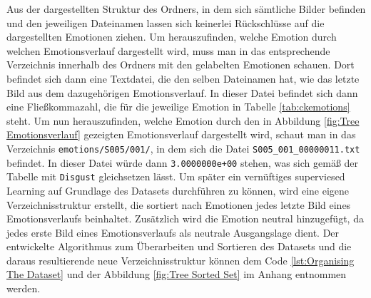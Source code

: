 \documentclass[12pt, a4paper]{report}
\begin{document}
Aus der dargestellten Struktur des Ordners, in dem sich sämtliche Bilder befinden und den jeweiligen Dateinamen lassen sich keinerlei Rückschlüsse auf die dargestellten Emotionen ziehen. Um herauszufinden, welche Emotion durch welchen Emotionsverlauf dargestellt wird, muss man in das entsprechende Verzeichnis innerhalb des Ordners mit den gelabelten Emotionen schauen. Dort befindet sich dann eine Textdatei, die den selben Dateinamen hat, wie das letzte Bild aus dem dazugehörigen Emotionsverlauf. In dieser Datei befindet sich dann eine Fließkommazahl, die für die jeweilige Emotion in Tabelle \ref{tab:ckemotions} steht. Um nun herauszufinden, welche Emotion durch den in Abbildung \ref{fig:Tree Emotionsverlauf} gezeigten Emotionsverlauf dargestellt wird, schaut man in das Verzeichnis \texttt{emotions/S005/001/}, in dem sich die Datei \texttt{S005\_001\_00000011.txt} befindet. In dieser Datei würde dann \texttt{3.0000000e+00} stehen, was sich gemäß der Tabelle mit \texttt{Disgust} gleichsetzen lässt.\newline
Um später ein vernüftiges superviesed Learning auf Grundlage des Datasets durchführen zu können, wird eine eigene Verzeichnisstruktur erstellt, die sortiert nach Emotionen jedes letzte Bild eines Emotionsverlaufs beinhaltet. Zusätzlich wird die Emotion neutral hinzugefügt, da jedes erste Bild eines Emotionsverlaufs als neutrale Ausgangslage dient. Der entwickelte Algorithmus zum Überarbeiten und Sortieren des Datasets und die daraus resultierende neue Verzeichnisstruktur können dem Code \ref{lst:Organising The Dataset} und der Abbildung \ref{fig:Tree Sorted Set} im Anhang entnommen werden.
\end{document}
